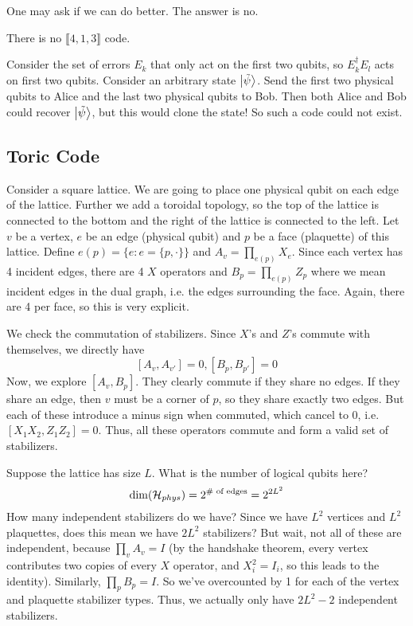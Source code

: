 One may ask if we can do better. The answer is no.
\begin{example}
    There is no $\llbracket 4, 1, 3 \rrbracket$ code.

    \begin{proof*}
        Consider the set of errors $E_k$ that only act on the first two qubits, so $E_k^{\dagger} E_l$ acts on first two qubits. Consider an arbitrary state $\ket{\tilde{\psi}}$.
        Send the first two physical qubits to Alice and the last two physical qubits to Bob. Then both Alice and Bob could recover $\ket{\tilde{\psi}}$,
        but this would clone the state! So such a code could not exist.
    \end{proof*}
\end{example}



\subsection{Toric Code}
Consider a square lattice. We are going to place one physical qubit on each edge of the lattice.
Further we add a toroidal topology, so the top of the lattice is connected to the bottom and the right of the lattice is connected to the left.
Let $v$ be a vertex, $e$ be an edge (physical qubit) and $p$ be a face (plaquette) of this lattice. Define $e(p) = \{ e : e = \{p, \cdot\}\}$ and
$A_v = \prod_{e(p)} X_e$. Since each vertex has 4 incident edges, there are 4 $X$ operators and $B_p = \prod_{e(p)} Z_p$
where we mean incident edges in the dual graph, i.e. the edges surrounding the face. Again, there are 4 per face, so this is very explicit.

We check the commutation of stabilizers. Since $X$'s and $Z$'s commute with themselves, we directly have
\[ [A_v, A_{v'}] = 0, [B_p, B_{p'}] = 0 \]
Now, we explore $[A_v, B_p]$. They clearly commute if they share no edges. If they share an edge, then $v$ must be a corner of $p$,
so they share exactly two edges. But each of these introduce a minus sign when commuted, which cancel to 0, i.e. $[X_1 X_2, Z_1 Z_2] = 0$.
Thus, all these operators commute and form a valid set of stabilizers. 

Suppose the lattice has size $L$. What is the number of logical qubits here?
\[ \dim (\operatorname{\mathcal{H}}_{phys}) = 2^{\text{\# of edges}} = 2^{2L^2} \]
How many independent stabilizers do we have? Since we have $L^2$ vertices and $L^2$ plaquettes, does this mean we have $2L^2$ stabilizers? But wait,
not all of these are independent, because $\prod_v A_v = I$ (by the handshake theorem, every vertex contributes
two copies of every $X$ operator, and $X_i^2 = I_i$, so this leads to the identity). Similarly, $\prod_p B_p = I$. So we've overcounted by 1 for each of the vertex and plaquette stabilizer types. 
Thus, we actually only have $2L^2 - 2$ independent
stabilizers. 

